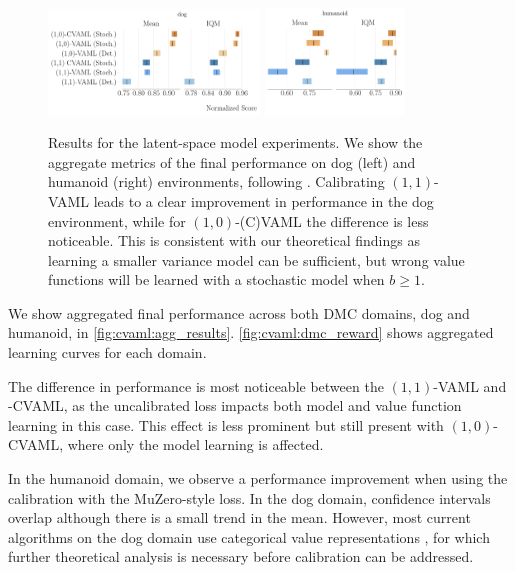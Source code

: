 \begin{figure}[t]
\centering
   \includegraphics[width=0.5\textwidth]{figures/lambda/plts/agg_dog.pdf} 
   \includegraphics[width=0.33\textwidth]{figures/lambda/plts/agg_hum.pdf} 
   \caption{Results for the latent-space model experiments. We show the aggregate metrics of the final performance on dog (left) and humanoid (right) environments, following \textcite{agarwal2021deep}. Calibrating $(1,1)$-VAML leads to a clear improvement in performance in the dog environment, while for $(1,0)$-(C)VAML the difference is less noticeable. This is consistent with our theoretical findings as learning a smaller variance model can be sufficient, but wrong value functions will be learned with a stochastic model when $b\geq1$.}
   \label{fig:cvaml:agg_results}
\end{figure}

We show aggregated final performance across both DMC domains, dog and humanoid, in \autoref{fig:cvaml:agg_results}.
\autoref{fig:cvaml:dmc_reward} shows aggregated learning curves for each domain.

The difference in performance is most noticeable between the $(1,1)$-VAML and -CVAML, as the uncalibrated loss impacts both model and value function learning in this case. 
This effect is less prominent but still present with $(1,0)$-CVAML, where only the model learning is affected.

In the humanoid domain, we observe a performance improvement when using the calibration with the MuZero-style loss.
In the dog domain, confidence intervals overlap although there is a small trend in the mean.
However, most current algorithms on the dog domain use categorical value representations \parencite{farebrother2024stop}, for which further theoretical analysis is necessary before calibration can be addressed.

